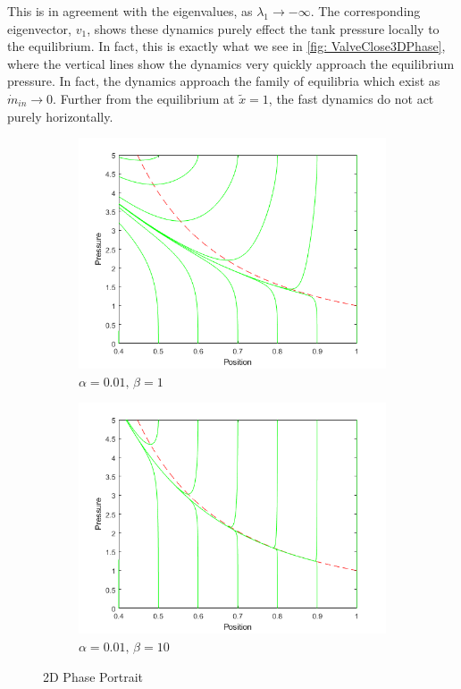 This is in agreement with the eigenvalues, as $\lambda_1 \rightarrow - \infty$. The corresponding eigenvector, $v_1$, shows these dynamics purely effect the tank pressure locally to the equilibrium. In fact, this is exactly what we see in \cref{fig: ValveClose3DPhase}, where the vertical lines show the dynamics very quickly approach the equilibrium pressure. In fact, the dynamics approach the family of equilibria which exist as $\dot{m}_{in} \rightarrow 0$. Further from the equilibrium at $\tilde{x} = 1$, the fast dynamics do not act purely horizontally.
~
% 
\begin{figure}[ht]
    \centering
    \begin{subfigure}{0.49\textwidth}
    \includegraphics[width=\textwidth]{Figures/LowFlow/PhasePortrait-b=1.png}
    \caption{$\alpha = 0.01, \, \beta = 1$}
    \label{fig: ValveClosePhase1}
    \end{subfigure}
    \begin{subfigure}{0.49\textwidth}
    \includegraphics[width=\textwidth]{Figures/LowFlow/PhasePortrait-b=10.png}
    \caption{$\alpha = 0.01, \, \beta = 10$}
    \label{fig: ValveClosePhase10}
    \end{subfigure}
    \caption{2D Phase Portrait}    \label{fig: ValveClosePhase}
\end{figure}

